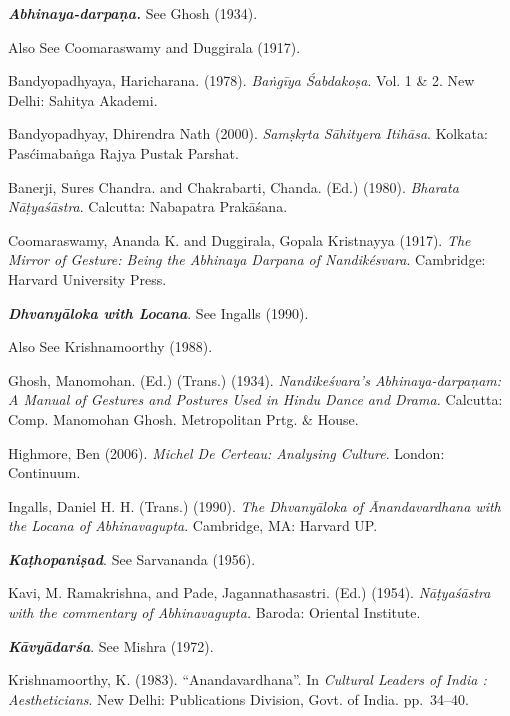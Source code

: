 \begin{thebibliography}{99}
\itemsep=2pt
{\sl\bfseries Abhinaya-darpaṇa.} See Ghosh (1934).

Also See Coomaraswamy and Duggirala (1917).

Bandyopadhyaya, Haricharana. (1978). \textsl{Baṅgīya Śabdakoṣa}. Vol. 1 \& 2. New Delhi: Sahitya Akademi. 

Bandyopadhyay, Dhirendra Nath (2000). \textsl{Samṣkṛta Sāhityera Itihāsa}. Kolkata: Pasćimabaṅga Rajya Pustak Parshat. 

Banerji, Sures Chandra. and Chakrabarti, Chanda. (Ed.) (1980). \textsl{Bharata Nāṭyaśāstra}. Calcutta: Nabapatra Prakāśana.

Coomaraswamy, Ananda K. and Duggirala, Gopala Kristnayya (1917). \textsl{The Mirror of Gesture: Being the Abhinaya Darpana of Nandikésvara}. Cambridge: Harvard University Press. 

{\sl\bfseries Dhvanyāloka with Locana}. See Ingalls (1990).

Also See Krishnamoorthy (1988).

Ghosh, Manomohan. (Ed.) (Trans.) (1934). \textsl{Nandikeśvara's Abhinaya-darpaṇam: A Manual of Gestures and Postures Used in Hindu Dance and Drama.} Calcutta: Comp. Manomohan Ghosh. Metropolitan Prtg. \& House. 

Highmore, Ben (2006). \textsl{Michel De Certeau: Analysing Culture}. London: Continuum.

Ingalls, Daniel H. H. (Trans.) (1990). \textsl{The Dhvanyāloka of Ānandavardhana with the Locana of Abhinavagupta}. Cambridge, MA: Harvard UP.

{\sl\bfseries Kaṭhopaniṣad}. See Sarvananda (1956).

Kavi, M. Ramakrishna, and Pade, Jagannathasastri. (Ed.) (1954). \textsl{Nāṭyaśāstra with the commentary of Abhinavagupta.} Baroda: Oriental Institute. 

{\sl\bfseries Kāvyādarśa}. See Mishra (1972).

Krishnamoorthy, K. (1983). “Anandavardhana”. In {\sl Cultural Leaders of India : Aestheticians}. New Delhi: Publications Division, Govt. of India. pp.~34--40.


\end{thebibliography}
